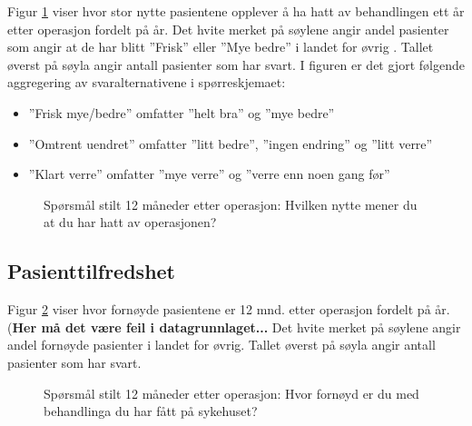 \documentclass [norsk,a4paper,twoside]{article}\usepackage[]{graphicx}\usepackage[]{color}
\begin{document}
Figur \ref{fig:Nytte} viser hvor stor nytte pasientene opplever å ha hatt av behandlingen ett år etter operasjon fordelt på år. Det hvite merket på søylene angir andel pasienter som angir at de har blitt ''Frisk'' eller ''Mye bedre'' i landet for øvrig . Tallet øverst på søyla angir antall pasienter som har svart. 
I figuren er det gjort følgende aggregering av svaralternativene i spørreskjemaet:
\begin{itemize}
	\item ''Frisk mye/bedre'' omfatter ''helt bra'' og ''mye bedre'' 
	\item ''Omtrent uendret'' omfatter ''litt bedre'', ''ingen endring'' og ''litt verre'' 
	\item ''Klart verre'' omfatter ''mye verre'' og ''verre enn noen gang før''
\end{itemize}



\begin{figure}[h] 
	\begin{center}
	\end{center}
  \caption{Spørsmål stilt 12 måneder etter operasjon: Hvilken nytte mener du at du har hatt av operasjonen?}
  \label{fig:Nytte}
\end{figure}




\subsection{Pasienttilfredshet}

Figur \ref{fig:Fornoyd} viser hvor fornøyde pasientene er 12 mnd. 
etter operasjon fordelt på år. (\textbf{Her må det være feil i datagrunnlaget...} Det hvite merket på søylene angir andel fornøyde pasienter i landet for øvrig. Tallet øverst på søyla angir antall pasienter som har svart. 


\begin{figure}[h] 
	\begin{center}
	\end{center}
  \caption{Spørsmål stilt 12 måneder etter operasjon: Hvor fornøyd er du med behandlinga du har fått på sykehuset?}
  \label{fig:Fornoyd}
\end{figure}
\end{document}
